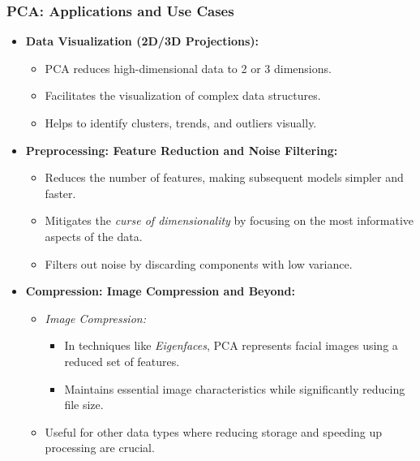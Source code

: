 \documentclass[aspectratio=169]{beamer}
\begin{document}
\begin{frame}
    \frametitle{PCA: Applications and Use Cases}
    \begin{itemize}
        \item \textbf{Data Visualization (2D/3D Projections):}
            \begin{itemize}
                \item PCA reduces high-dimensional data to 2 or 3 dimensions.
                \item Facilitates the visualization of complex data structures.
                \item Helps to identify clusters, trends, and outliers visually.
            \end{itemize}
        \item \textbf{Preprocessing: Feature Reduction and Noise Filtering:}
            \begin{itemize}
                \item Reduces the number of features, making subsequent models simpler and faster.
                \item Mitigates the \emph{curse of dimensionality} by focusing on the most informative aspects of the data.
                \item Filters out noise by discarding components with low variance.
            \end{itemize}
        \item \textbf{Compression: Image Compression and Beyond:}
            \begin{itemize}
                \item \emph{Image Compression:} 
                    \begin{itemize}
                        \item In techniques like \emph{Eigenfaces}, PCA represents facial images using a reduced set of features.
                        \item Maintains essential image characteristics while significantly reducing file size.
                    \end{itemize}
                \item Useful for other data types where reducing storage and speeding up processing are crucial.
            \end{itemize}

\end{itemize}
\end{frame}
\end{document}
